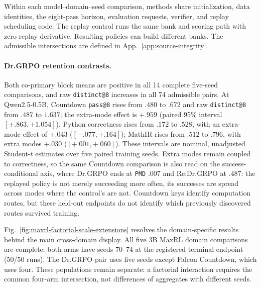 \documentclass{article}
\newcommand{\1}{\mathbf 1}
\newcommand{\pmd}{\texttt{PMD}}
\theoremstyle{remark}
\theoremstyle{definition}
\theoremstyle{plain}
\begin{document}
Within each model--domain--seed comparison, methods share initialization,
data identities, the eight-pass horizon, evaluation requests, verifier, and
replay scheduling code. The replay control runs the same bank and scoring
path with zero replay derivative. Resulting policies can build different
banks. The admissible intersections are defined in
App.~\ref{app:source-integrity}.

\crossscaletablematerial

\paragraph{Dr.GRPO retention contrasts.}
\label{app:retention-numerical-detail}
Both co-primary block means are positive in all 14 complete five-seed
comparisons, and raw \texttt{distinct@8} increases in all 74 admissible pairs.
At Qwen2.5-0.5B, Countdown \texttt{pass@8} rises from $.480$ to $.672$ and
raw \texttt{distinct@8} from $.487$ to $1.637$; the extra-mode effect is
$+.959$ (paired 95\% interval $[+.863,+1.054]$). Python correctness rises
from $.172$ to $.528$, with an extra-mode effect of $+.043$
($[-.077,+.164]$); MathIR rises from $.512$ to $.796$, with extra modes
$+.030$ ($[+.001,+.060]$). These intervals are nominal, unadjusted
Student-$t$ estimates over five paired training seeds. Extra modes remain
coupled to correctness, so the same Countdown comparison is also read on the
success-conditional axis, where Dr.GRPO ends at \pmd{} $.007$ and
Re:Dr.GRPO at $.487$: the replayed policy is not merely succeeding more
often, its successes are spread across modes where the control's are not. Countdown keys identify computation routes, but
these held-out endpoints do not identify which previously discovered
routes survived training.


Fig.~\ref{fig:maxrl-factorial-scale-extensions} resolves the domain-specific
results behind the main cross-domain display. All five 3B MaxRL domain comparisons are complete:
both arms have seeds 70--74 at the registered terminal endpoint (50/50 runs).
The Dr.GRPO pair uses five seeds except Falcon Countdown, which uses four. These populations
remain separate: a factorial interaction requires the common four-arm
intersection, not differences of aggregates with different seeds.
\end{document}
